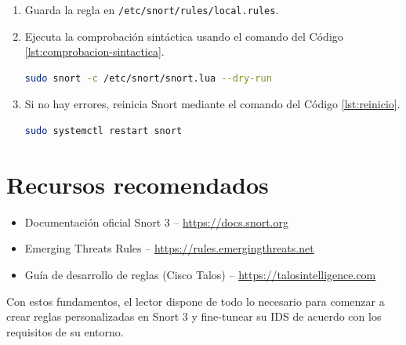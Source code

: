 \documentclass[11pt,a4paper,twoside]{report}
\begin{document}
\begin{enumerate}
	\item Guarda la regla en \texttt{/etc/snort/rules/local.rules}.
	\item Ejecuta la comprobación sintáctica usando el comando del Código \ref{lst:comprobacion-sintactica}.
		\begin{lstlisting}[language=bash, caption={Comprobación sintáctica.}, label={lst:comprobacion-sintactica}]
		sudo snort -c /etc/snort/snort.lua --dry-run
	\end{lstlisting}
	\item Si no hay errores, reinicia Snort mediante el comando del Código \ref{lst:reinicio}.
	\begin{lstlisting}[language=bash, caption={Reinicio del servicio de Snort.}, label={lst:reinicio}]
		sudo systemctl restart snort
	\end{lstlisting}
\end{enumerate}


\section{Recursos recomendados}

\begin{itemize}
	\item Documentación oficial Snort 3 – \url{https://docs.snort.org}
	\item Emerging Threats Rules – \url{https://rules.emergingthreats.net}
	\item Guía de desarrollo de reglas (Cisco Talos) – \url{https://talosintelligence.com}
\end{itemize}

Con estos fundamentos, el lector dispone de todo lo necesario para comenzar a crear reglas personalizadas en Snort 3 y fine-tunear su IDS de acuerdo con los requisitos de su entorno.

\clearpage
\null
\thispagestyle{empty}
\newpage

\end{document}
